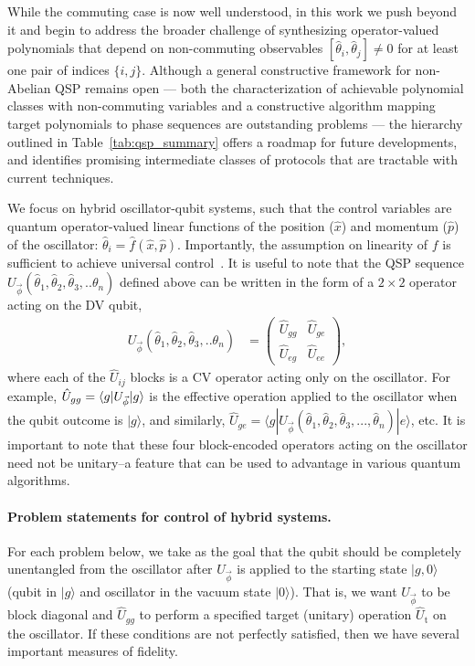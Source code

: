 \documentclass[aps,prx,showpacs,notitlepage,twocolumn,superscriptaddress,nofootinbib,preprintnumbers,floatfix,10pt, longbibliography]{revtex4-2}
\begin{document}
While the commuting case is now well understood, in this work we push beyond it and begin to address the broader challenge of synthesizing operator-valued polynomials that depend on non-commuting observables $[\hat\theta_i,\hat\theta_j]\neq 0$ for at least one pair of indices $\{i,j\}$. Although a general constructive framework for non-Abelian QSP remains open --- both the characterization of achievable polynomial classes with non-commuting variables and a constructive algorithm mapping target polynomials to phase sequences are outstanding problems --- the hierarchy outlined in Table~\ref{tab:qsp_summary} offers a roadmap for future developments, and identifies promising intermediate classes of protocols that are tractable with current techniques.

We focus on hybrid oscillator-qubit systems, such that the control variables are quantum operator-valued linear functions of the position ($\hat x$) and momentum ($\hat p$) of the oscillator: $\hat\theta_i=\hat f(\hat x, \hat p)$. Importantly, the assumption on linearity of $f$ is sufficient to achieve universal control~\cite{ISA,eickbusch2022fast}. It is useful to note that the QSP sequence $U_{\vec\phi}(\hat\theta_1,\hat \theta_2,\hat \theta_3,..\theta_n)$ defined above can be written in the form of a $2\times 2$ operator acting on the DV qubit,
\begin{align}
  U_{\vec{\phi}}(\hat\theta_1,\hat \theta_2,\hat \theta_3,..\theta_n) &= \left( \begin{array}{cc} \hat U_{gg}& \hat U_{ge}\\\hat U_{eg}&\hat U_{ee}  \end{array} \right),\label{eq:Umatrix}
\end{align}
where each of the $\hat U_{ij}$ blocks is a CV operator acting only on the oscillator. For example, $\hat U_{gg}=\braket{g|U_{\vec{\phi}}|g}$ is the effective operation applied to the oscillator when the qubit outcome is $|g\rangle$, and similarly, $\hat U_{ge}=\langle g| U_{\vec{\phi}}(\hat\theta_1,\hat \theta_2,\hat \theta_3,...,\hat \theta_n)|e\rangle$, etc.  It is important to note that these four block-encoded operators acting on the oscillator need not be unitary--a feature that can be used to advantage in various quantum algorithms.

\paragraph{Problem statements for control of hybrid systems.} For each problem below, we take as the goal that the qubit should be completely unentangled from the oscillator after $U_{\vec{\phi}}$ is applied to the starting state $|g,0\rangle$ (qubit in $|g\rangle$ and oscillator in the vacuum state $|0\rangle$). That is, we want $U_{\vec{\phi}}$ to be block diagonal and $\hat U_{gg}$ to perform a specified target (unitary) operation $\hat U_\mathrm{t}$ on the oscillator. If these conditions are not perfectly satisfied, then we have several important measures of fidelity. 
\end{document}
